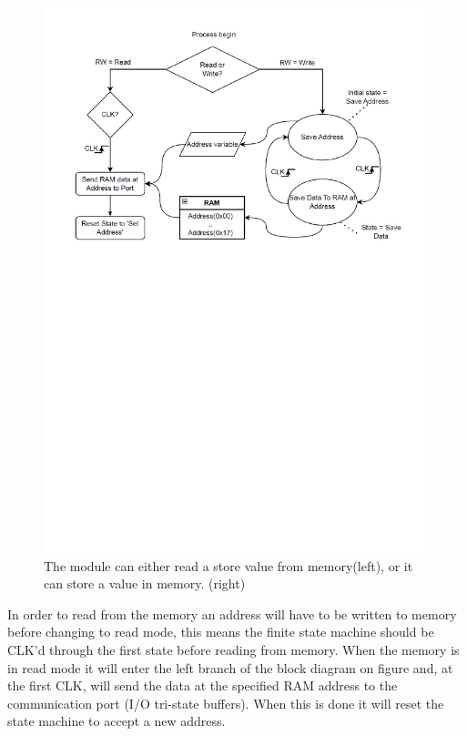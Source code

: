 \begin{figure}[H]
    \centering
    \includegraphics[clip, trim=0 450 0 0, width=1\textwidth]{Sections/7_SystemDesign/Figures/7_2_2_MemoryBlockDiagram.pdf}
    \caption{The module can either read a store value from memory(left), or it can store a value in memory. (right)}
    \label{fig:7_2_2_MemoryBlock}
\end{figure}

In order to read from the memory an address will have to be written to memory before changing to read mode, this means the finite state machine should be CLK'd through the first state before reading from memory. When the memory is in read mode it will enter the left branch of the block diagram on figure  and, at the first CLK, will send the data at the specified RAM address to the communication port (I/O tri-state buffers). When this is done it will reset the state machine to accept a new address.

